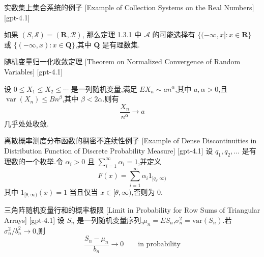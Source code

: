 \documentclass[UTF8]{ctexart}
\begin{document}
    
    
    \begin{xmp}
        {实数集上集合系统的例子}
        [Example of Collection Systems on the Real Numbers]
        [gpt-4.1]
        
如果 $(S, \mathcal{S}) = (\mathbf{R}, \mathcal{R})$, 那么定理 1.3.1 中 $\mathcal{A}$ 的可能选择有 $\{ (-\infty, x] : x \in \mathbf{R} \}$ 或 $\{ (-\infty, x) : x \in \mathbf{Q} \}$,其中 $\mathbf{Q}$ 是有理数集.

    \end{xmp}
    
    
    
    \begin{thm}
        {随机变量归一化收敛定理}
        [Theorem on Normalized Convergence of Random Variables]
        [gpt-4.1]
        
设 $0 \leq X_{1} \leq X_{2} \leq \cdots$ 是一列随机变量,满足 $E X_{n} \sim a n^{\alpha}$,其中 $a, \alpha > 0$,且 $\operatorname{var}(X_{n}) \leq B n^{\beta}$,其中 $\beta < 2\alpha$.则有
\[
\frac{X_{n}}{n^{\alpha}} \to a
\]
几乎处处收敛.

    \end{thm}
    
    
    
    \begin{xmp}
        {离散概率测度分布函数的稠密不连续性例子}
        [Example of Dense Discontinuities in Distribution Function of Discrete Probability Measure]
        [gpt-4.1]
        设 $q_1, q_2, \ldots$ 是有理数的一个枚举.令 $\alpha_i > 0$ 且 $\sum_{i=1}^{\infty} \alpha_i = 1$,并定义
\[
F(x) = \sum_{i=1}^{\infty} \alpha_i 1_{[q_i, \infty)}
\]
其中 $1_{[\theta, \infty)}(x) = 1$ 当且仅当 $x \in [\theta, \infty)$,否则为 $0$.
    \end{xmp}
    
    
    
    \begin{thm}
        {三角阵随机变量行和的概率极限}
        [Limit in Probability for Row Sums of Triangular Arrays]
        [gpt-4.1]
        设 $S_n$ 是一列随机变量序列,$\mu_n = E S_n$,$\sigma_n^2 = \mathrm{var}(S_n)$.若 $\sigma_n^2 / b_n^2 \to 0$,则
\[
\frac{S_n - \mu_n}{b_n} \to 0 \qquad \text{in probability}
\]

    \end{thm}
    
\end{document}

